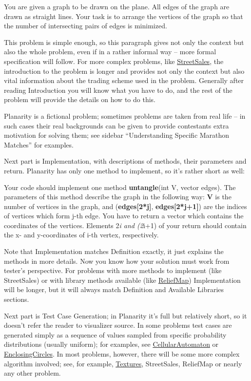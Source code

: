 \documentclass[]{article}
\begin{document}
You are given a graph to be drawn on the plane. All edges of the graph
are drawn as straight lines. Your task is to arrange the vertices of the
graph so that the number of intersecting pairs of edges is minimized.

This problem is simple enough, so this paragraph gives not only the
context but also the whole problem, even if in a rather informal way --
more formal specification will follow. For more complex problems, like
\href{http://community.topcoder.com/longcontest/?module=ViewProblemStatement\&rd=14354\&pm=10034}{StreetSales},
the introduction to the problem is longer and provides not only the
context but also vital information about the trading scheme used in the
problem. Generally after reading Introduction you will know what you
have to do, and the rest of the problem will provide the details on how
to do this.

Planarity is a fictional problem; sometimes problems are taken from real
life -- in such cases their real backgrounds can be given to provide
contestants extra motivation for solving them; see sidebar
``Understanding Specific Marathon Matches'' for examples.

Next part is Implementation, with descriptions of methods, their
parameters and return. Planarity has only one method to implement, so
it's rather short as well:

Your code should implement one method \textbf{untangle}(int V, vector
edges). The parameters of this method describe the graph in the
following way: \textbf{V} is the number of vertices in the graph, and
(\textbf{edges{[}2*j{]}}, \textbf{edges{[}2*j+1{]}}) are the indices of
vertices which form j-th edge. You have to return a vector which
contains the coordinates of the vertices. Elements 2\emph{i and (2}i+1)
of your return should contain the x- and y-coordinates of i-th vertex,
respectively.

Note that Implementation matches Definition exactly, it just explains
the methods in more details. Now you know how your solution must work
from tester's perspective. For problems with more methods to implement
(like StreetSales) or with library methods available (like
\href{http://community.topcoder.com/longcontest/?module=ViewProblemStatement\&rd=13766\&pm=10322}{ReliefMap})
Implementation will be longer, but it will always match Definition and
Available Libraries sections.

Next part is Test Case Generation; in Planarity it's full but relatively
short, so it doesn't refer the reader to visualizer source. In some
problems test cases are generated simply as a sequence of values sampled
from specific probability distributions (usually uniform); for examples,
see
\href{http://community.topcoder.com/longcontest/?module=ViewProblemStatement\&rd=14273\&pm=10989}{CellularAutomaton}
or
\href{http://community.topcoder.com/longcontest/?module=ViewProblemStatement\&rd=13964\&pm=10655}{EnclosingCircles}.
In most problems, however, there will be some more complex algorithm
involved; see, for example,
\href{http://community.topcoder.com/longcontest/?module=ViewProblemStatement\&rd=12203\&pm=8737}{Textures},
StreetSales, ReliefMap or nearly any other problem.
\end{document}
